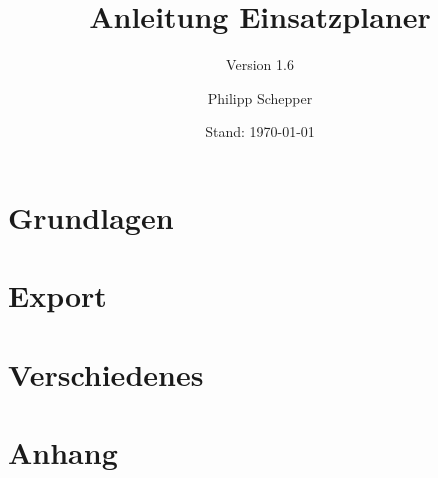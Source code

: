 \documentclass[a4paper,ngerman,oneside]{scrbook}
\title{Anleitung Einsatzplaner}
\subtitle{Version 1.6}
\author{Philipp Schepper}
\date{Stand: \today}
\begin{document}
\maketitle

\frontmatter
\tableofcontents


\mainmatter
\part{Grundlagen}





\part{Export}


\part{Verschiedenes}



\appendix
\part{Anhang}



\end{document}
